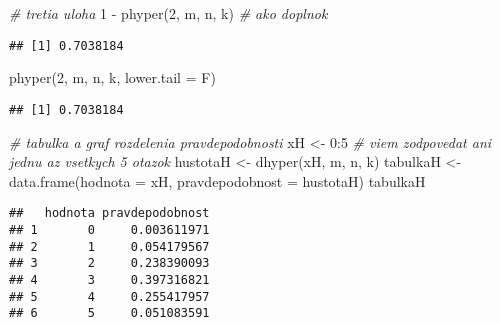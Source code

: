 \documentclass[
]{article}
\newenvironment{Shaded}{\begin{snugshade}}{\end{snugshade}}
\newcommand{\AttributeTok}[1]{\textcolor[rgb]{0.77,0.63,0.00}{#1}}
\newcommand{\CommentTok}[1]{\textcolor[rgb]{0.56,0.35,0.01}{\textit{#1}}}
\newcommand{\DecValTok}[1]{\textcolor[rgb]{0.00,0.00,0.81}{#1}}
\newcommand{\FloatTok}[1]{\textcolor[rgb]{0.00,0.00,0.81}{#1}}
\newcommand{\FunctionTok}[1]{\textcolor[rgb]{0.00,0.00,0.00}{#1}}
\newcommand{\NormalTok}[1]{#1}
\newcommand{\OtherTok}[1]{\textcolor[rgb]{0.56,0.35,0.01}{#1}}
\newcommand{\SpecialCharTok}[1]{\textcolor[rgb]{0.00,0.00,0.00}{#1}}
\newcommand{\StringTok}[1]{\textcolor[rgb]{0.31,0.60,0.02}{#1}}
\begin{document}
\begin{Shaded}
\begin{Highlighting}[]
\CommentTok{\# tretia uloha}
\DecValTok{1} \SpecialCharTok{{-}} \FunctionTok{phyper}\NormalTok{(}\DecValTok{2}\NormalTok{, m, n, k) }\CommentTok{\# ako doplnok}
\end{Highlighting}
\end{Shaded}

\begin{verbatim}
## [1] 0.7038184
\end{verbatim}

\begin{Shaded}
\begin{Highlighting}[]
\FunctionTok{phyper}\NormalTok{(}\DecValTok{2}\NormalTok{, m, n, k, }\AttributeTok{lower.tail =}\NormalTok{ F)}
\end{Highlighting}
\end{Shaded}

\begin{verbatim}
## [1] 0.7038184
\end{verbatim}

\begin{Shaded}
\begin{Highlighting}[]
\CommentTok{\# tabulka a graf rozdelenia pravdepodobnosti}
\NormalTok{xH }\OtherTok{\textless{}{-}} \DecValTok{0}\SpecialCharTok{:}\DecValTok{5} \CommentTok{\# viem zodpovedat ani jednu az vsetkych 5 otazok}
\NormalTok{hustotaH }\OtherTok{\textless{}{-}} \FunctionTok{dhyper}\NormalTok{(xH, m, n, k)}
\NormalTok{tabulkaH }\OtherTok{\textless{}{-}} \FunctionTok{data.frame}\NormalTok{(}\AttributeTok{hodnota =}\NormalTok{ xH, }\AttributeTok{pravdepodobnost =}\NormalTok{ hustotaH)}
\NormalTok{tabulkaH}
\end{Highlighting}
\end{Shaded}

\begin{verbatim}
##   hodnota pravdepodobnost
## 1       0     0.003611971
## 2       1     0.054179567
## 3       2     0.238390093
## 4       3     0.397316821
## 5       4     0.255417957
## 6       5     0.051083591
\end{verbatim}

\begin{Shaded}
\end{Shaded}
\end{document}
